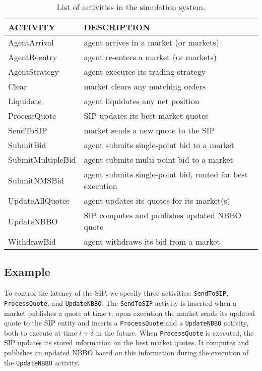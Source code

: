 \documentclass[11pt]{article}
\begin{document}
\begin{table}
\centering
\begin{tabular}{l l}
\uppercase{Activity} 	& \uppercase{Description} \\ \hline
\textsf{AgentArrival} 	& agent arrives in a market (or markets) \\
\textsf{AgentReentry}	& agent re-enters a market (or markets) \\
\textsf{AgentStrategy} 	& agent executes its trading strategy \\
\textsf{Clear} 			& market clears any matching orders \\
\textsf{Liquidate} 		& agent liquidates any net position \\
\textsf{ProcessQuote} 	& SIP updates its best market quotes \\
\textsf{SendToSIP} 		& market sends a new quote to the SIP \\
\textsf{SubmitBid} 		& agent submits single-point bid to a market \\
\textsf{SubmitMultipleBid} 	& agent submits multi-point bid to a market \\
\textsf{SubmitNMSBid} 	& agent submits single-point bid, routed for best execution \\
\textsf{UpdateAllQuotes}	& agent updates its quotes for its market(s) \\
\textsf{UpdateNBBO} 		& SIP computes and publishes updated NBBO quote \\
\textsf{WithdrawBid} 	& agent withdraws its bid from a market \\
\end{tabular}
\caption{List of activities in the simulation system.}
\label{tab:activity}
\end{table}


\subsection{Example}

To control the latency of the SIP, we specify three activities: \verb|SendToSIP|, \verb|ProcessQuote|, and \verb|UpdateNBBO|.
The \verb|SendToSIP| activity is inserted when a market publishes a quote at time $t$; upon execution the market sends its updated quote to the SIP entity and inserts a \verb|ProcessQuote| and a \verb|UpdateNBBO| activity, both to execute at time $t + \delta$ in the future.
%
When \verb|ProcessQuote| is executed, the SIP updates its stored information on the best market quotes. It computes and publishes an updated NBBO based on this information during the execution of the \verb|UpdateNBBO| activity.
\end{document}
